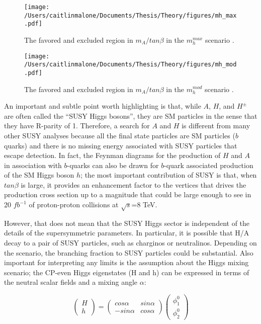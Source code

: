 \begin{figure}
	\centering
	\caption{The favored and excluded region in $m_A/tan\beta$ in the $m_h^{max}$ scenario \cite{Carena-2}. \label{fig:mh_max}}
	\texttt{[image: /Users/caitlinmalone/Documents/Thesis/Theory/figures/mh\_max.pdf]}
\end{figure}


\begin{figure}
	\centering
	\caption{The favored and excluded region in $m_A/tan\beta$ in the $m_h^{mod}$ scenario \cite{Carena-2}. \label{fig:mh_mod}}
	\texttt{[image: /Users/caitlinmalone/Documents/Thesis/Theory/figures/mh\_mod.pdf]}
\end{figure}





An important and subtle point worth highlighting is that, while $A$, $H$, and $H^\pm$ are often called the ``SUSY Higgs bosons'', they are SM particles in the sense that they have R-parity of 1.  Therefore, a search for $A$ and $H$ is different from many other SUSY analyses because all the final state particles are SM particles ($b$ quarks) and there is no missing energy associated with SUSY particles that escape detection.  In fact, the Feynman diagrams for the production of $H$ and $A$ in association with $b$-quarks can also be drawn for $b$-quark associated production of the SM Higgs boson $h$; the most important contribution of SUSY is that, when $tan\beta$ is large, it provides an enhancement factor to the vertices that drives the production cross section up to a magnitude that could be large enough to see in 20 $fb^{-1}$ of proton-proton collisions at $\sqrt{s}$=8 TeV.

However, that does not mean that the SUSY Higgs sector is independent of the details of the supersymmetric parameters.  In particular, it is possible that H/A decay to a pair of SUSY particles, such as charginos or neutralinos.  Depending on the scenario, the branching fraction to SUSY particles could be substantial.  Also important for interpreting any limits is the assumption about the Higgs mixing scenario; the CP-even Higgs eigenstates (H and h) can be expressed in terms of the neutral scalar fields and a mixing angle $\alpha$:

\begin{equation}
    \begin{pmatrix}
         H \\ h  
    \end{pmatrix}
    = 
    \begin{pmatrix}
        cos\alpha & sin\alpha \\
        -sin\alpha & cos\alpha
    \end{pmatrix}
    \begin{pmatrix}
        \phi^0_1 \\ \phi^0_2
    \end{pmatrix}
\end{equation}

